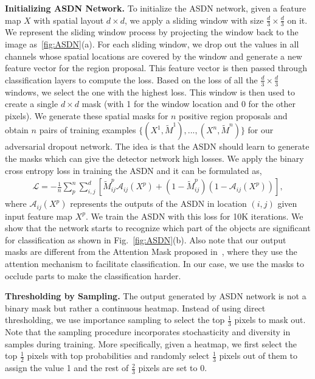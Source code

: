 \documentclass[10pt,twocolumn,letterpaper]{article}
\begin{document}
\textbf{Initializing ASDN Network.} To initialize the ASDN network, given a feature map $X$ with spatial layout $d \times d$, we apply a sliding window with size $\frac{d}{3} \times \frac{d}{3}$ on it. We represent the sliding window process by projecting the window back to the image as~\ref{fig:ASDN}(a). For each sliding window, we drop out  the values in all channels whose spatial locations are covered by the window and generate a new feature vector for the region proposal. This feature vector is then passed through classification layers to compute the loss. Based on the loss of all the  $\frac{d}{3} \times \frac{d}{3}$ windows, we select the one with the highest loss. This window is then used to create a single $d \times d$ mask (with 1 for the window location and 0 for the other pixels). We generate these spatial masks for $n$ positive region proposals and obtain $n$ pairs of training examples $\{(X^{1}, \tilde{M}^{1}),..., (X^{n}, \tilde{M}^{n})\}$  for our adversarial dropout network. The idea is that the ASDN should learn to generate the masks which can give the detector network high losses. We apply the binary cross entropy loss in training the ASDN and it can be formulated as,
{\small
\begin{eqnarray}\label{eq:loss_mask}
\mathcal{L} =  - \frac{1}{n} \sum_{p}^{n} \sum_{i, j}^{d} [\tilde{M}_{ij}^p \mathcal{A}_{ij}(X^p) + (1 - \tilde{M}_{ij}^p) (1 - \mathcal{A}_{ij}(X^p)) ], 
\end{eqnarray}
}
where $\mathcal{A}_{ij}(X^p)$ represents the outputs of the ASDN in location $(i,j)$ given input feature map $X^p$. We train the ASDN with this loss for 10K iterations. We show that the network starts to recognize which part of the objects are significant for classification as shown in Fig.~\ref{fig:ASDN}(b). Also note that our output masks are different from the Attention Mask proposed in~\cite{ruslanattention}, where they use the attention mechanism to facilitate classification. In our case, we use the masks to occlude parts to make the classification harder. 




\textbf{Thresholding by Sampling.} The output generated by ASDN network is not a binary mask but rather a continuous heatmap. Instead of using direct  thresholding, we use importance sampling to select the top $\frac{1}{3}$ pixels to mask out. Note that the sampling procedure incorporates stochasticity and diversity in samples during training. More specifically, given a heatmap, we first select the top $\frac{1}{2}$ pixels with top probabilities and randomly select $\frac{1}{3}$ pixels out of them to assign the value 1 and the rest of $\frac{2}{3}$ pixels are set to 0. 
\end{document}
